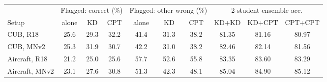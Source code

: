 \begin{tabular}{l ccc ccc ccc}
\toprule
 & \multicolumn{3}{c}{Flagged: correct (\%)} & \multicolumn{3}{c}{Flagged: other wrong (\%)} & \multicolumn{3}{c}{2-student ensemble acc.} \\
\cmidrule(lr){2-4}\cmidrule(lr){5-7}\cmidrule(lr){8-10}
Setup & alone & KD & CPT & alone & KD & CPT & KD+KD & KD+CPT & CPT+CPT \\
\midrule
CUB, R18 & 25.6 & 29.3 & 32.2 & 41.4 & 31.3 & 38.2 & 81.35 & 81.16 & 80.97 \\
CUB, MNv2 & 25.3 & 31.9 & 30.7 & 42.2 & 31.0 & 38.2 & 82.46 & 82.14 & 81.56 \\
Aircraft, R18 & 21.2 & 25.0 & 25.6 & 57.7 & 52.6 & 55.8 & 83.35 & 83.60 & 83.29 \\
Aircraft, MNv2 & 23.1 & 27.6 & 30.8 & 51.3 & 42.3 & 48.1 & 85.04 & 84.90 & 85.12 \\
\bottomrule
\end{tabular}
